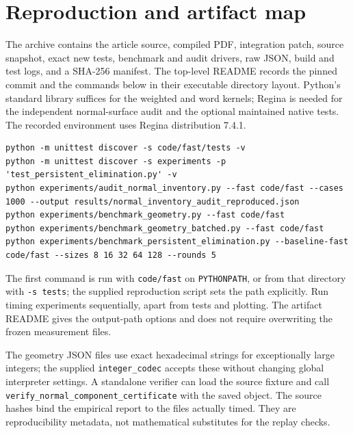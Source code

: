 \documentclass[11pt,a4paper]{article}
\theoremstyle{definition}
\theoremstyle{remark}
\newcommand{\code}[1]{\texttt{#1}}
\begin{document}


\appendix
\section{Reproduction and artifact map}
\label{sec:reproduction}

The archive contains the article source, compiled PDF, integration patch,
source snapshot, exact new tests, benchmark and audit drivers, raw JSON,
build and test logs, and a SHA-256 manifest. The top-level README records
the pinned commit and the commands below in their executable directory
layout. Python's standard library suffices for the weighted and word
kernels; Regina is needed for the independent normal-surface audit and
the optional maintained native tests. The recorded environment uses
Regina distribution 7.4.1.

\begin{lstlisting}
python -m unittest discover -s code/fast/tests -v
python -m unittest discover -s experiments -p 'test_persistent_elimination.py' -v
python experiments/audit_normal_inventory.py --fast code/fast --cases 1000 --output results/normal_inventory_audit_reproduced.json
python experiments/benchmark_geometry.py --fast code/fast
python experiments/benchmark_geometry_batched.py --fast code/fast
python experiments/benchmark_persistent_elimination.py --baseline-fast code/fast --sizes 8 16 32 64 128 --rounds 5
\end{lstlisting}

The first command is run with \code{code/fast} on \code{PYTHONPATH}, or
from that directory with \code{-s tests}; the supplied reproduction script
sets the path explicitly. Run timing experiments sequentially, apart from
tests and plotting. The artifact README gives the output-path options and
does not require overwriting the frozen measurement files.

The geometry JSON files use exact hexadecimal strings for exceptionally
large integers; the supplied \code{integer\_codec} accepts these without
changing global interpreter settings. A standalone verifier can load the
source fixture and call
\code{verify\_normal\_component\_certificate} with the saved object.
The source hashes bind the empirical report to the files actually timed.
They are reproducibility metadata, not mathematical substitutes for the
replay checks.
\end{document}
